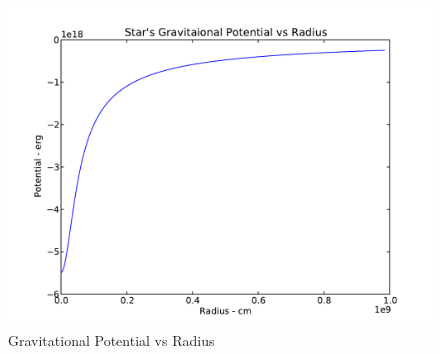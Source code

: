 \documentclass[11pt,letterpaper]{article}
\begin{document}
\begin{figure}
\centering
\includegraphics[width=\textwidth]{grav_pot.pdf}
\caption{Gravitational Potential vs Radius}
\label{fig:gravpot}
\end{figure}
\end{document}
